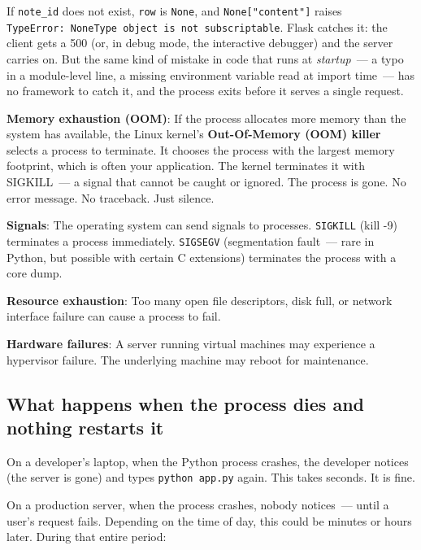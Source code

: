\noindent{}If \texttt{note\_id} does not exist, \texttt{row} is \texttt{None}, and \texttt{None{[}"content"{]}} raises \texttt{TypeError:}\allowbreak{}\texttt{\ \textquotesingle{}NoneType\textquotesingle{}\ object\ is\ not\ subscriptable}. Flask catches it: the client gets a 500 (or, in debug mode, the interactive debugger) and the server carries on. But the same kind of mistake in code that runs at \emph{startup}~--- a typo in a module-level line, a missing environment variable read at import time~--- has no framework to catch it, and the process exits before it serves a single request.

\textbf{Memory exhaustion (OOM)}: If the process allocates more memory than the system has available, the Linux kernel's \textbf{Out-Of-Memory (OOM) killer} selects a process to terminate. It chooses the process with the largest memory footprint, which is often your application. The kernel terminates it with SIGKILL~--- a signal that cannot be caught or ignored. The process is gone. No error message. No traceback. Just silence.

\textbf{Signals}: The operating system can send signals to processes. \texttt{SIGKILL} (kill -9) terminates a process immediately. \texttt{SIGSEGV} (segmentation fault~--- rare in Python, but possible with certain C extensions) terminates the process with a core dump.

\textbf{Resource exhaustion}: Too many open file descriptors, disk full, or network interface failure can cause a process to fail.

\textbf{Hardware failures}: A server running virtual machines may experience a hypervisor failure. The underlying machine may reboot for maintenance.

\subsection*{What happens when the process dies and nothing restarts it}\label{11-reliability-security-gaps:what-happens-when-the-process-dies-and-nothing-restarts-it}

On a developer's laptop, when the Python process crashes, the developer notices (the server is gone) and types \texttt{python\ app.py} again. This takes seconds. It is fine.

On a production server, when the process crashes, nobody notices~--- until a user's request fails. Depending on the time of day, this could be minutes or hours later. During that entire period:

